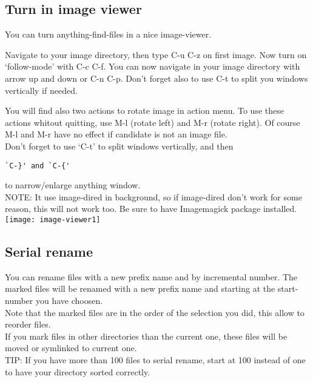 \documentclass[a4paper,11pt]{article}
\begin{document}
\subsection{Turn in image viewer}
\label{sec:turn-image-viewer}
You can turn anything-find-files in a nice image-viewer.

Navigate to your image directory, then type C-u C-z on first image.
Now turn on `follow-mode' with C-c C-f.
You can now navigate in your image directory with arrow up and down or C-n C-p.
Don't forget also to use C-t to split you windows vertically if needed.

You will find also two actions to rotate image in action menu. 
To use these actions whitout quitting, use M-l (rotate left) and M-r (rotate right).
Of course M-l and M-r have no effect if candidate is not an image file.\\

Don't forget to use `C-t' to split windows vertically, and then
\begin{verbatim}
`C-}' and `C-{'
\end{verbatim}
to narrow/enlarge anything window.\\

NOTE:
It use image-dired in background, so if image-dired don't work for some reason, this will
not work too.
Be sure to have Imagemagick package installed.\\

\texttt{[image: image-viewer1]}
\newpage

\subsection{Serial rename}
\label{sec:serial-rename}
You can rename files with a new prefix name and by incremental number.
The marked files will be renamed with a new prefix name and starting
at the start-number you have choosen.\\
Note that the marked files are in the order of the selection you did, this allow to reorder
files.\\
If you mark files in other directories than the current one, these files will be moved or symlinked to current one.\\

TIP: If you have more than 100 files to serial rename, start at 100 instead of one to have your directory
sorted correctly.\\
\end{document}
